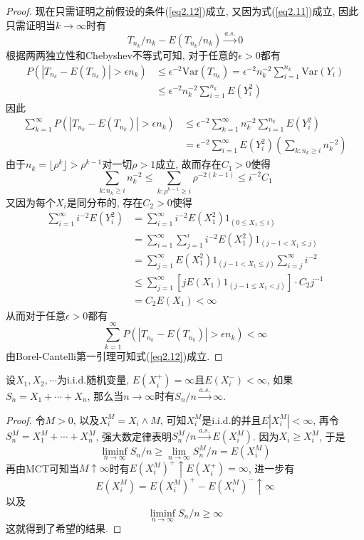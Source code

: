 \documentclass[cn, 12pt, math=mtpro2, bibstyle=apa, blue, twocol]{elegantbook}
\newcommand{\limn}{\lim_{n\to\infty}}
\begin{document}
\begin{proof}
  现在只需证明之前假设的条件(\ref{eq2.12})成立, 又因为式(\ref{eq2.11})成立, 因此只需证明当$k\to\infty$时有
  \begin{equation}\label{eq2.13}
    T_{n_k}/n_k-E(T_{n_k}/n_k)\xrightarrow{a.s.} 0
  \end{equation}
  根据两两独立性和Chebyshev不等式可知, 对于任意的$\epsilon>0$都有
  \begin{align*}
  P(|T_{n_k}-E(T_{n_k})|>\epsilon n_k)&\leq \epsilon^{-2}\text{Var}(T_{n_k})=\epsilon^{-2}n_k^{-2}\sum_{i=1}^{n_k}\text{Var}(Y_i) \\
  &\leq \epsilon^{-2}n_k^{-2}\sum_{i=1}^{n_k}E(Y_i^2)
  \end{align*}
  因此
  \begin{align*}
  \sum_{k=1}^{\infty}P(|T_{n_k}-E(T_{n_k})|>\epsilon n_k)&\leq \epsilon^{-2}\sum_{k=1}^{\infty}n_k^{-2}\sum_{i=1}^{n_k}E(Y_i^2) \\
  &=\epsilon^{-2}\sum_{i=1}^{\infty}E(Y_i^2)\left(\sum_{k:n_k\geq i}n_k^{-2}\right)
  \end{align*}
  由于$n_k=\lfloor\rho^k\rfloor>\rho^{k-1}$对一切$\rho>1$成立, 故而存在$C_1>0$使得
  $$\sum_{k:n_k\geq i}n_k^{-2}\leq\sum_{k:\rho^{k-1}\geq i}\rho^{-2(k-1)}\leq i^{-2}C_1$$
  又因为每个$X_i$是同分布的, 存在$C_2>0$使得
  \begin{align*}
  \sum_{i=1}^{\infty}i^{-2}E(Y_i^2)&=\sum_{i=1}^{\infty}i^{-2}E(X_1^2)1_{(0\leq X_1\leq i)} \\
  &=\sum_{i=1}^{\infty}\sum_{j=1}^{i}i^{-2}E(X_1^2)1_{(j-1<X_1\leq j)} \\
  &=\sum_{j=1}^{\infty}E(X_1^2)1_{(j-1<X_1\leq j)}\sum_{i=j}^{\infty}i^{-2} \\
  &\leq \sum_{j=1}^{\infty}[jE(X_1)1_{(j-1\leq X_1<j)}]\cdot C_2j^{-1}\\
  &=C_2E(X_1)<\infty
  \end{align*}
  从而对于任意$\epsilon>0$都有
  $$\sum_{k=1}^{\infty}P(|T_{n_k}-E(T_{n_k})|>\epsilon n_k)<\infty$$
  由Borel-Cantelli第一引理可知式(\ref{eq2.12})成立.

\end{proof}
\begin{theorem}\label{thm:thm2.9}
  设$X_1,X_2,\cdots$为i.i.d.随机变量, $E(X_i^+)=\infty$且$E(X_i^-)<\infty$, 如果$S_n=X_1+\cdots+X_n$, 那么当$n\to\infty$时有$S_n/n\xrightarrow{a.s.}\infty$.
\end{theorem}
\begin{proof}
  令$M>0$, 以及$X_i^M=X_i\wedge M$, 可知$X_i^M$是i.i.d.的并且$E|X_i^M|<\infty$, 再令$S_n^M=X_1^M+\cdots+X_n^M$, 强大数定律表明$S_n^M/n\xrightarrow{a.s.}E(X_i^M)$. 因为$X_i\geq X_i^M$, 于是
  $$\liminf_{n\to\infty}S_n/n\geq \limn S_n^M/n=E(X_i^M)$$
  再由MCT可知当$M\uparrow\infty$时有$E(X_i^{M})^+\uparrow E(X_i^+)=\infty$, 进一步有$$E(X_i^M)=E(X_i^M)^+-E(X_i^M)^-\uparrow \infty$$以及$$\liminf_{n\to\infty} S_n/n\geq\infty$$这就得到了希望的结果.
\end{proof}
\end{document}
